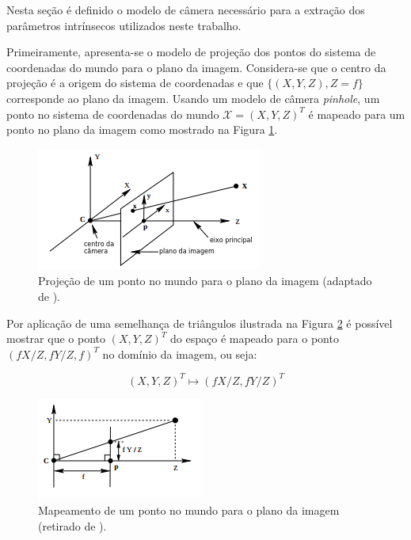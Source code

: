 {Nesta seção é definido o modelo de câmera necessário para a extração dos
parâmetros intrínsecos utilizados neste trabalho. 

Primeiramente, apresenta-se o modelo de projeção dos pontos do sistema de
coordenadas do mundo para o plano da imagem. Considera-se que o centro da
projeção é a origem do sistema de coordenadas e que $\{(X,Y,Z), Z = f\}$
corresponde ao plano da imagem. Usando um modelo de câmera \textit{pinhole}, um
ponto no sistema de coordenadas do mundo $\mathcal{X} = (X,Y,Z)^T$ é mapeado
para um ponto no plano da imagem como mostrado na Figura \ref{fig:projeção}.

\begin{figure}[h!]
\centering
\includegraphics[width=.5\linewidth]{figs/TG_pinhole_1_pt.png}
\caption{Projeção de um ponto no mundo para o plano da imagem (adaptado de \cite{hartley2003multiple}).}
\label{fig:projeção}
\end{figure}

Por aplicação de uma semelhança de triângulos ilustrada na Figura \ref{fig:mapeamento} é possível mostrar que o ponto $(X,Y,Z)^T$ do espaço é mapeado para o ponto $(fX/Z,fY/Z,f)^T$ no domínio da imagem, ou seja:

\begin{equation}
(X,Y,Z)^T \mapsto (fX/Z,fY/Z)^T
\label{eq:3d_mapPonto}
\end{equation}


\begin{figure}[h!]
\centering
\includegraphics[width=.5\linewidth]{figs/TG_pinhole_2.png}
\caption{Mapeamento de um ponto no mundo para o plano da imagem (retirado de \cite{hartley2003multiple}).}
\label{fig:mapeamento}
\end{figure}

}
